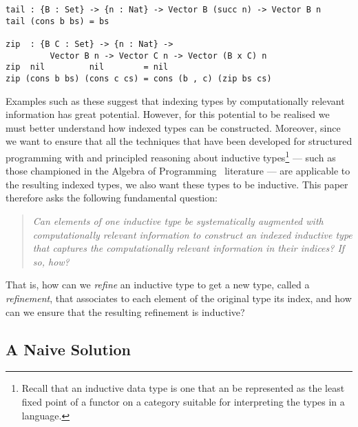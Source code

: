 \documentclass{LMCS}
\begin{document}
\begin{verbatim}
tail : {B : Set} -> {n : Nat} -> Vector B (succ n) -> Vector B n
tail (cons b bs) = bs

zip  : {B C : Set} -> {n : Nat} -> 
         Vector B n -> Vector C n -> Vector (B x C) n
zip  nil         nil        = nil
zip (cons b bs) (cons c cs) = cons (b , c) (zip bs cs)
\end{verbatim}

\noindent
Examples such as these suggest that indexing types by computationally
relevant information has great potential. However, for this potential
to be realised we must better understand how indexed types can be
constructed. Moreover, since we want to ensure that all the techniques
that have been developed for structured programming with and
principled reasoning about inductive types\footnote{Recall that an
  inductive data type is one that an be represented as the least fixed
  point  of a functor  on a category suitable for
  interpreting the types in a language.} --- such as those championed
in the Algebra of Programming~\cite{bdm97} literature --- are
applicable to the resulting indexed types, we also want these types to
be inductive.  This paper therefore asks the following fundamental
question:

\vspace*{0.1in}

\begin{quote}
  \em Can elements of one inductive type be systematically augmented
  with computationally relevant information to construct an indexed
  inductive type that captures the computationally relevant
  information in their indices? If so, how?
\end{quote}

\vspace*{0.1in}

\noindent
That is, how can we {\em refine} an inductive type to get a new type,
called a {\em refinement}, that associates to each element of the
original type its index, and how can we ensure that the resulting
refinement is inductive?

\subsection{A Naive Solution}
\end{document}
